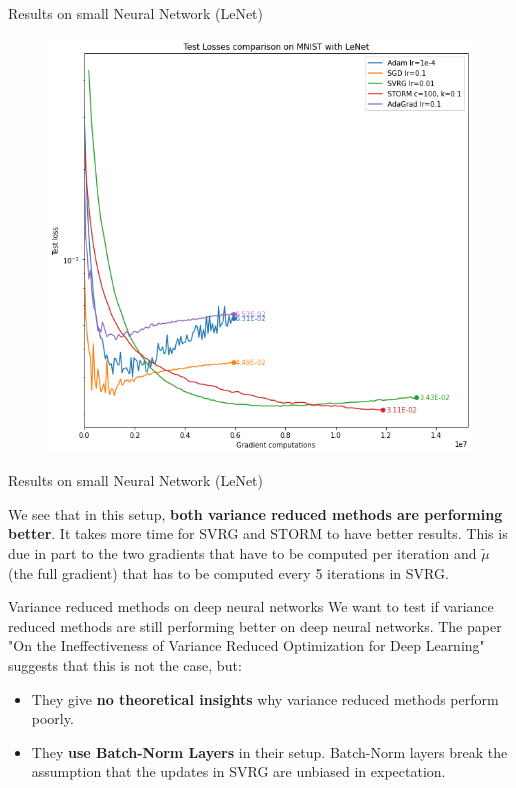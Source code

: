 \documentclass[10pt]{beamer}
\begin{document}
\begin{frame}{Results on small Neural Network (LeNet)}
    \begin{figure}
        \centering
    \includegraphics[scale=0.35]{midterm presentation/images/testLossesMnist.png}
        \label{fig:testLossesMnist}
    \end{figure}   
\end{frame}

\begin{frame}{Results on small Neural Network (LeNet)}

    We see that in this setup, \textbf{both variance reduced methods are performing better}.
    \newline
    It takes more time for SVRG and STORM to have better results. This is due in part to the two gradients that have to be computed per iteration and $\tilde{\mu}$ (the full gradient) that has to be computed every 5 iterations in SVRG.

\end{frame}

\begin{frame}{Variance reduced methods on deep neural networks}
    We want to test if variance reduced methods are still performing better on deep neural networks.
    \newline
    The paper "On the Ineffectiveness of Variance Reduced
    Optimization for Deep Learning"~\citep{Defazio2019} suggests that this is not the case, but:
    \begin{itemize}
        \item They give \textbf{no theoretical insights} why variance reduced methods perform poorly.
        \item They \textbf{use Batch-Norm Layers} in their setup. Batch-Norm layers break the assumption that the updates in SVRG are unbiased in expectation.
    \end{itemize}
\end{frame}
\end{document}
